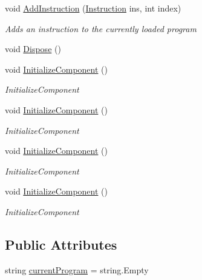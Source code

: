 \begin{DoxyCompactItemize}
void \hyperlink{class_c_p_u___o_s___simulator_1_1_main_window_ae73f56ccee0f45b0df54438b3d397dd9}{Add\+Instruction} (\hyperlink{class_c_p_u___o_s___simulator_1_1_c_p_u_1_1_instruction}{Instruction} ins, int index)
\begin{DoxyCompactList}\small\item\em Adds an instruction to the currently loaded program \end{DoxyCompactList}\item 
void \hyperlink{class_c_p_u___o_s___simulator_1_1_main_window_a195e7715af146b207e5b973bd10c80c6}{Dispose} ()
\item 
void \hyperlink{class_c_p_u___o_s___simulator_1_1_main_window_a30724af44ae89c2172130c2dd36e145c}{Initialize\+Component} ()
\begin{DoxyCompactList}\small\item\em Initialize\+Component \end{DoxyCompactList}\item 
void \hyperlink{class_c_p_u___o_s___simulator_1_1_main_window_a30724af44ae89c2172130c2dd36e145c}{Initialize\+Component} ()
\begin{DoxyCompactList}\small\item\em Initialize\+Component \end{DoxyCompactList}\item 
void \hyperlink{class_c_p_u___o_s___simulator_1_1_main_window_a30724af44ae89c2172130c2dd36e145c}{Initialize\+Component} ()
\begin{DoxyCompactList}\small\item\em Initialize\+Component \end{DoxyCompactList}\item 
void \hyperlink{class_c_p_u___o_s___simulator_1_1_main_window_a30724af44ae89c2172130c2dd36e145c}{Initialize\+Component} ()
\begin{DoxyCompactList}\small\item\em Initialize\+Component \end{DoxyCompactList}\end{DoxyCompactItemize}
\subsection*{Public Attributes}
\begin{DoxyCompactItemize}
\item 
string \hyperlink{class_c_p_u___o_s___simulator_1_1_main_window_a91f063d9cf776004dc74e719ef942907}{current\+Program} = string.\+Empty
\end{DoxyCompactItemize}

